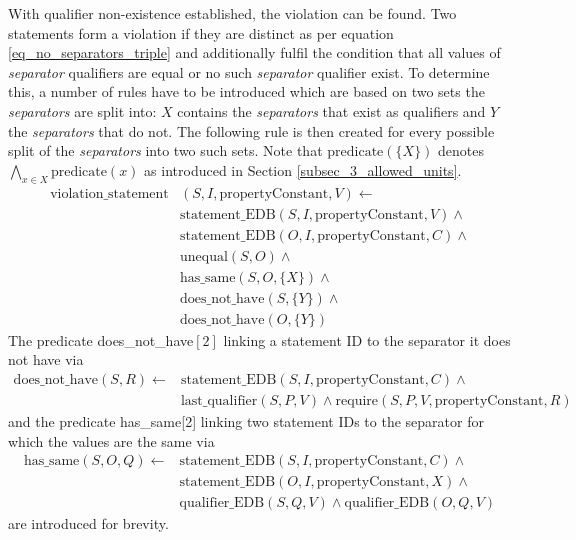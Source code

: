 \documentclass[hyperref,bachelorofscience,fleqn]{cgvpub}
\begin{document}
With qualifier non-existence established, the violation can be found. Two statements form a violation if they are distinct as per equation \ref{eq_no_separators_triple} and additionally fulfil the condition that all values of \emph{separator} qualifiers are equal or no such \emph{separator} qualifier exist. To determine this, a number of rules have to be introduced which are based on two sets the \emph{separators} are split into: \(X\) contains the \emph{separators} that exist as qualifiers and \(Y\) the \emph{separators} that do not. The following rule is then created for every possible split of the \emph{separators} into two such sets. Note that \(\text{predicate}(\{X\})\) denotes \(\bigwedge_{x \in X} \text{predicate}(x)\) as introduced in Section \ref{subsec_3_allowed_units}.
\begin{equation*}
\begin{split}
\text{violation\_statement}&(S, I, \text{propertyConstant}, V) \leftarrow \\
&\text{statement\_EDB}(S, I, \text{propertyConstant}, V) \wedge{} \\
&\text{statement\_EDB}(O, I, \text{propertyConstant}, C) \wedge{} \\
&\text{unequal}(S, O) \wedge{} \\
&\text{has\_same}(S, O, \{X\}) \wedge{} \\
&\text{does\_not\_have}(S, \{Y\}) \wedge{} \\
&\text{does\_not\_have}(O, \{Y\})
\end{split}
\end{equation*}
The predicate does\_not\_have\([2]\) linking a statement ID to the separator it does not have via 
\begin{equation*}
\begin{split}
\text{does\_not\_have}(S, R) \leftarrow &\text{statement\_EDB}(S, I, \text{propertyConstant}, C) \wedge{} \\
&\text{last\_qualifier}(S, P, V) \wedge \text{require}(S, P, V, \text{propertyConstant}, R)
\end{split}
\end{equation*}
and the predicate has\_same[2] linking two statement IDs to the separator for which the values are the same via
\begin{equation*}
\begin{split}
\text{has\_same}(S, O, Q) \leftarrow &\text{statement\_EDB}(S, I, \text{propertyConstant}, C) \wedge{} \\
&\text{statement\_EDB}(O, I, \text{propertyConstant}, X) \wedge{} \\
&\text{qualifier\_EDB}(S, Q, V) \wedge \text{qualifier\_EDB}(O, Q, V)
\end{split}
\end{equation*}
are introduced for brevity.
\end{document}
